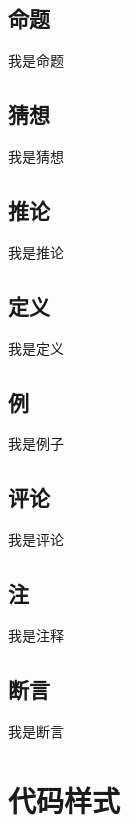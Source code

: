 \subsection{命题}
    \begin{props}
        我是命题
    \end{props}
\subsection{猜想}
    \begin{conj}
        我是猜想
    \end{conj}
\subsection{推论}
    \begin{infer}
        我是推论
    \end{infer}
\subsection{定义}
    \begin{defi}
        我是定义
    \end{defi}
\subsection{例}
    \begin{exmp}
        我是例子
    \end{exmp}
\subsection{评论}
    \begin{remark}
        我是评论
    \end{remark}
\subsection{注}
    \begin{note}
        我是注释
    \end{note}
\subsection{断言}
    \begin{asset}
        我是断言
    \end{asset}
\clearpage
\section[代码样式]{代码样式}

